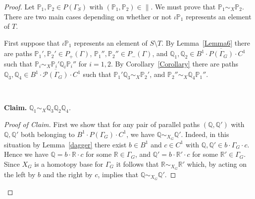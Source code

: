 \documentclass[11pt]{amsart}
\theoremstyle{plain}
\begin{document}
\begin{proof}
Let ${\mathbb{P}}_1, {\mathbb{P}}_2 \in P(\Gamma_S)$ with $({\mathbb{P}}_1,{\mathbb{P}}_2) \in \parallel$. We must prove that ${\mathbb{P}}_1 \sim_X {\mathbb{P}}_2$. There are two main cases depending on whether or not $\iota {\mathbb{P}}_1$ represents an element of $T$.

First suppose that  $\iota {\mathbb{P}}_1$ represents an element of $S \setminus T$. By Lemma~\ref{Lemma6} there are paths ${\mathbb{P}}_1', {\mathbb{P}}_2' \in P_+(\Gamma)$, ${\mathbb{P}}_1'', {\mathbb{P}}_2'' \in P_-(\Gamma)$, and ${\mathbb{Q}}_1, {\mathbb{Q}}_2 \in \overline{B^1 \cdot P(\Gamma_G) \cdot C^1}$ such that ${\mathbb{P}}_i \sim_X {\mathbb{P}}_i' {\mathbb{Q}}_i {\mathbb{P}}_i''$ for $i=1,2$. By Corollary~\ref{Corollary} there are paths ${\mathbb{Q}}_3, {\mathbb{Q}}_4 \in \overline{B^1 \cdot \mathcal{P}(\Gamma_G) \cdot C^1}$ such that ${\mathbb{P}}_1' {\mathbb{Q}}_3 \sim_X {\mathbb{P}}_2'$, and ${\mathbb{P}}_2'' \sim_X {\mathbb{Q}}_4 {\mathbb{P}}_1''$.

\

\noindent \textbf{Claim.}
\noindent \textit{${\mathbb{Q}}_1 \sim_{X} {\mathbb{Q}}_3 {\mathbb{Q}}_2 {\mathbb{Q}}_4$.}
\begin{proof}[Proof of Claim]
First we show that for any pair of parallel paths $({\mathbb{Q}}, {\mathbb{Q}}')$ with ${\mathbb{Q}}, {\mathbb{Q}}'$ both belonging to $B^1 \cdot P(\Gamma_G) \cdot C^1$,  we have ${\mathbb{Q}} \sim_{X_G} {\mathbb{Q}}'$. Indeed, in this situation by Lemma~\ref{dagger} there exist $b \in B^1$ and $c \in C^1$ with ${\mathbb{Q}}, {\mathbb{Q}}' \in b \cdot \Gamma_G \cdot c$. Hence we have ${\mathbb{Q}} = b \cdot {\mathbb{R}} \cdot c$ for some ${\mathbb{R}} \in \Gamma_G$, and ${\mathbb{Q}}' = b \cdot {\mathbb{R}}' \cdot c$ for some ${\mathbb{R}}' \in \Gamma_G$. Since $X_G$ is a homotopy base for $\Gamma_G$ it follows that ${\mathbb{R}} \sim_{X_G} {\mathbb{R}}' $ which, by acting on the left by $b$ and the right by $c$, implies that ${\mathbb{Q}} \sim_{X_G} {\mathbb{Q}}'$. 


\end{proof}
\end{proof}
\end{document}
